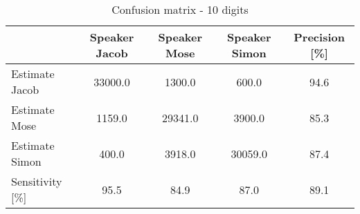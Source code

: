 \begin{table}[H]                          
\centering                                                     
\begin{tabular}{|l|c|c|c|c|}                                   
\hline                                                         
  & Speaker Jacob & Speaker Mose & Speaker Simon & Precision [\%] \\
\hline                                                         
Estimate Jacob & 33000.0 & 1300.0 & 600.0 & 94.6 \\            
\hline                                                         
Estimate Mose & 1159.0 & 29341.0 & 3900.0 & 85.3 \\            
\hline                                                         
Estimate Simon & 400.0 & 3918.0 & 30059.0 & 87.4 \\            
\hline                                                         
Sensitivity [\%] & 95.5 & 84.9 & 87.0 & 89.1 \\                
\hline                                                         
\end{tabular}                                                  
\caption{Confusion matrix - 10 digits}                         
\label{table:GMM_conf_10}                                      
\end{table}

















